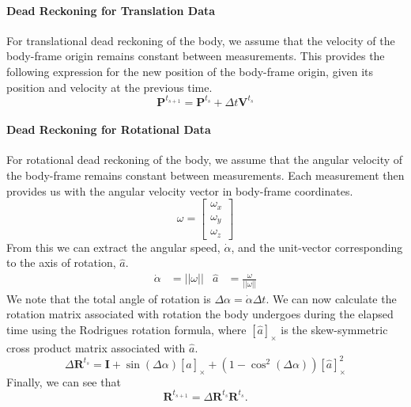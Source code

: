 \documentclass{report}
\begin{document}
					\paragraph{Dead Reckoning for Translation Data} For translational dead reckoning of the body, we assume that the velocity of the body-frame origin remains constant between measurements. This provides the following expression for the new position of the body-frame origin, given its position and velocity at the previous time.
					\begin{equation}
						\mathbf{P}^{t_{s+1}}=\mathbf{P}^{t_s}+\Delta{t}\mathbf{V}^{t_s}
					\end{equation}
					\paragraph{Dead Reckoning for Rotational Data} For rotational dead reckoning of the body, we assume that the angular velocity of the body-frame remains constant between measurements. Each measurement then provides us with the angular velocity vector in body-frame coordinates.
					\begin{equation}
						\omega=\begin{bmatrix}
							\omega_x \\
							\omega_y \\
							\omega_z
						\end{bmatrix}
					\end{equation}
					From this we can extract the angular speed, $\dot{\alpha}$, and the unit-vector corresponding to the axis of rotation, $\hat{a}$.
					\begin{align}
						\dot{\alpha}&=\left|\left|\omega\right|\right| & \hat{a}&=\frac{\omega}{\left|\left|\omega\right|\right|}
					\end{align}
					We note that the total angle of rotation is $\Delta\alpha=\dot{\alpha}\Delta{t}$. We can now calculate the rotation matrix associated with rotation the body undergoes during the elapsed time using the Rodrigues rotation formula, where $\left[\hat{a}\right]_{\times}$ is the skew-symmetric cross product matrix associated with $\hat{a}$.
					\begin{equation}
						\Delta\mathbf{R}^{t_s} = \mathbf{I} + \sin\left(\Delta\alpha\right)\left[\hat{a}\right]_{\times} + \left(1-\cos^2\left(\Delta\alpha\right)\right)\left[\hat{a}\right]_{\times}^2
					\end{equation}
					Finally, we can see that
					\begin{equation}
						\mathbf{R}^{t_{s+1}}=\Delta\mathbf{R}^{t_s}\mathbf{R}^{t_s}.
					\end{equation}
\end{document}
